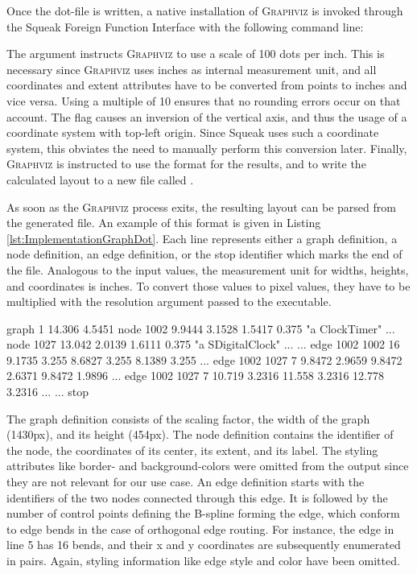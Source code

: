 Once the dot-file is written, a native installation of \textsc{Graphviz} is invoked through the Squeak Foreign Function Interface with the following command line:
\begin{center}
\end{center}
The  argument instructs \textsc{Graphviz} to use a scale of 100 dots per inch.
This is necessary since \textsc{Graphviz} uses inches as internal measurement unit, and all coordinates and extent attributes have to be converted from points to inches and vice versa.
Using a multiple of 10 ensures that no rounding errors occur on that account.
The  flag causes an inversion of the vertical axis, and thus the usage of a coordinate system with top-left origin.
Since Squeak uses such a coordinate system, this obviates the need to manually perform this conversion later.
Finally, \textsc{Graphviz} is instructed to use the  format for the results, and to write the calculated layout to a new file called .

As soon as the \textsc{Graphviz} process exits, the resulting layout can be parsed from the generated file.
An example of this  format is given in Listing \ref{lst:ImplementationGraphDot}.
Each line represents either a graph definition, a node definition, an edge definition, or the stop identifier which marks the end of the file.
Analogous to the input values, the measurement unit for widths, heights, and coordinates is inches.
To convert those values to pixel values, they have to be multiplied with the resolution argument passed to the  executable.

\begin{graphviz}[caption={Output in plain-ext format as produced by \textsc{Graphviz} for the input from Listing \ref{lst:ImplementationGraphDot}}, label=lst:ImplementationGraphPlainExt]
graph 1 14.306 4.5451
node 1002 9.9444 3.1528 1.5417 0.375 "a ClockTimer" ...
node 1027 13.042 2.0139 1.6111 0.375 "a SDigitalClock" ...
...
edge 1002 1002 16 9.1735 3.255 8.6827 3.255 8.1389 3.255 ...
edge 1002 1027 7 9.8472 2.9659 9.8472 2.6371 9.8472 1.9896 ...
edge 1002 1027 7 10.719 3.2316 11.558 3.2316 12.778 3.2316 ...
...
stop
\end{graphviz}

The graph definition consists of the scaling factor, the width of the graph (1430px), and its height (454px).
The node definition contains the identifier of the node, the coordinates of its center, its extent, and its label.
The styling attributes like border- and background-colors were omitted from the output since they are not relevant for our use case.
An edge definition starts with the identifiers of the two nodes connected through this edge.
It is followed by the number of control points defining the B-spline forming the edge, which conform to edge bends in the case of orthogonal edge routing.
For instance, the edge in line 5 has 16 bends, and their x and y coordinates are subsequently enumerated in pairs.
Again, styling information like edge style and color have been omitted.

